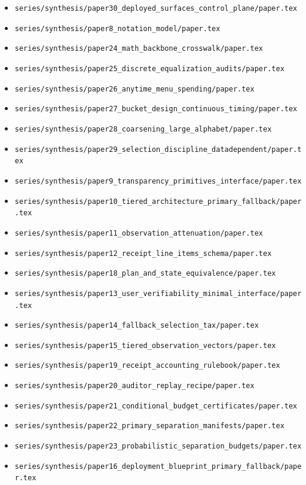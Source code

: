 \documentclass[11pt]{article}
\begin{document}
\begin{itemize}[leftmargin=*]
\item \texttt{series/synthesis/paper30\_deployed\_surfaces\_control\_plane/paper.tex}
\item \texttt{series/synthesis/paper8\_notation\_model/paper.tex}
\item \texttt{series/synthesis/paper24\_math\_backbone\_crosswalk/paper.tex}
\item \texttt{series/synthesis/paper25\_discrete\_equalization\_audits/paper.tex}
\item \texttt{series/synthesis/paper26\_anytime\_menu\_spending/paper.tex}
\item \texttt{series/synthesis/paper27\_bucket\_design\_continuous\_timing/paper.tex}
\item \texttt{series/synthesis/paper28\_coarsening\_large\_alphabet/paper.tex}
\item \texttt{series/synthesis/paper29\_selection\_discipline\_datadependent/paper.tex}
\item \texttt{series/synthesis/paper9\_transparency\_primitives\_interface/paper.tex}
\item \texttt{series/synthesis/paper10\_tiered\_architecture\_primary\_fallback/paper.tex}
\item \texttt{series/synthesis/paper11\_observation\_attenuation/paper.tex}
\item \texttt{series/synthesis/paper12\_receipt\_line\_items\_schema/paper.tex}
\item \texttt{series/synthesis/paper18\_plan\_and\_state\_equivalence/paper.tex}
\item \texttt{series/synthesis/paper13\_user\_verifiability\_minimal\_interface/paper.tex}
\item \texttt{series/synthesis/paper14\_fallback\_selection\_tax/paper.tex}
\item \texttt{series/synthesis/paper15\_tiered\_observation\_vectors/paper.tex}
\item \texttt{series/synthesis/paper19\_receipt\_accounting\_rulebook/paper.tex}
\item \texttt{series/synthesis/paper20\_auditor\_replay\_recipe/paper.tex}
\item \texttt{series/synthesis/paper21\_conditional\_budget\_certificates/paper.tex}
\item \texttt{series/synthesis/paper22\_primary\_separation\_manifests/paper.tex}
\item \texttt{series/synthesis/paper23\_probabilistic\_separation\_budgets/paper.tex}
\item \texttt{series/synthesis/paper16\_deployment\_blueprint\_primary\_fallback/paper.tex}

\end{itemize}
\end{document}

